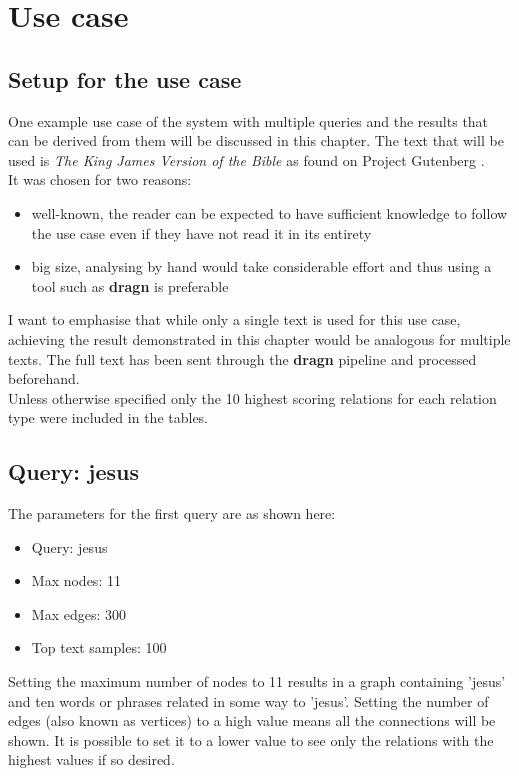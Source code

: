 \chapter{Use case}\label{usecase}
\section{Setup for the use case}
One example use case of the system with multiple queries and the results that can be derived from them will be discussed in this chapter. The text that will be used is \textit{The King James Version of the Bible} as found on Project Gutenberg \cite{GutenbergBible}.\\
It was chosen for two reasons:
\begin{itemize}
    \item well-known, the reader can be expected to have sufficient knowledge to follow the use case even if they have not read it in its entirety
    \item big size, analysing by hand would take considerable effort and thus using a tool such as \textbf{dragn} is preferable
\end{itemize}
I want to emphasise that while only a single text is used for this use case, achieving the result demonstrated in this chapter would be analogous for multiple texts.
The full text has been sent through the \textbf{dragn} pipeline and processed beforehand.\\
Unless otherwise specified only the 10 highest scoring relations for each relation type were included in the tables.

%
%
%
%
\clearpage
\section{Query: jesus}
\label{sec:query_jesus}
The parameters for the first query are as shown here:
\begin{itemize}
    \item Query: jesus
    \item Max nodes: 11
    \item Max edges: 300
    \item Top text samples: 100
\end{itemize}
Setting the maximum number of nodes to 11 results in a graph containing 'jesus' and ten words or phrases related in some way to 'jesus'. Setting the number of edges (also known as vertices) to a high value means all the connections will be shown. It is possible to set it to a lower value to see only the relations with the highest values if so desired.

